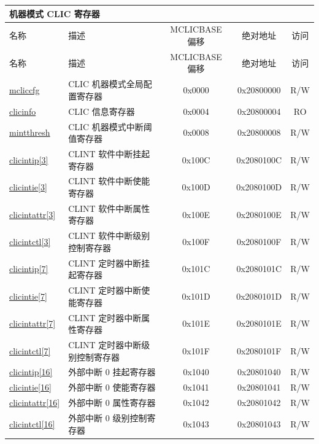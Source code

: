 \begin{longtable}{ | p{1.8cm} | p{7.5cm} | c | c | c | }
\hline
\multicolumn{5}{|l|}{\textbf{机器模式 CLIC 寄存器}} \\\hline
\hline\rowcolor{lightgray}
名称 & 描述 & MCLICBASE 偏移 & 绝对地址 & 访问 \\ \hline
\endfirsthead
\hline
\rowcolor{lightgray}
名称 & 描述 & MCLICBASE 偏移 & 绝对地址 & 访问 \\
\hline
\endhead
\endfoot
\hyperref[regdesc:MCLICCFG_REG]{mcliccfg} & CLIC 机器模式全局配置寄存器 & 0x0000 & 0x20800000 & R/W \\\hline
\hyperref[regdesc:CLICINFO_REG]{clicinfo} & CLIC 信息寄存器 & 0x0004 & 0x20800004 & RO \\\hline
\hyperref[regdesc:MINTTHRESH]{mintthresh} & CLIC 机器模式中断阈值寄存器 & 0x0008 & 0x20800008 & R/W \\\hline

\hyperref[regdesc:MCLICINTIP_REG_i]{clicintip[3]} & CLINT 软件中断挂起寄存器 & 0x100C & 0x2080100C & R/W \\\hline
\hyperref[regdesc:MCLICINTIE_REG_i]{clicintie[3]} & CLINT 软件中断使能寄存器 & 0x100D & 0x2080100D & R/W \\\hline
\hyperref[regdesc:MCLICINTATTR_REG_i]{clicintattr[3]} & CLINT 软件中断属性寄存器 & 0x100E & 0x2080100E & R/W \\\hline
\hyperref[regdesc:MCLICINTCTL_REG_i]{clicintctl[3]} & CLINT 软件中断级别控制寄存器 & 0x100F & 0x2080100F & R/W \\\hline

\hyperref[regdesc:MCLICINTIP_REG_i]{clicintip[7]} & CLINT 定时器中断挂起寄存器 & 0x101C & 0x2080101C & R/W \\\hline
\hyperref[regdesc:MCLICINTIE_REG_i]{clicintie[7]} & CLINT 定时器中断使能寄存器 & 0x101D & 0x2080101D & R/W \\\hline
\hyperref[regdesc:MCLICINTATTR_REG_i]{clicintattr[7]} & CLINT 定时器中断属性寄存器 & 0x101E & 0x2080101E & R/W \\\hline
\hyperref[regdesc:MCLICINTCTL_REG_i]{clicintctl[7]} & CLINT 定时器中断级别控制寄存器 & 0x101F & 0x2080101F & R/W \\\hline

\hyperref[regdesc:MCLICINTIP_REG_i]{clicintip[16]} & 外部中断 0 挂起寄存器 & 0x1040 & 0x20801040 & R/W \\\hline
\hyperref[regdesc:MCLICINTIE_REG_i]{clicintie[16]} & 外部中断 0 使能寄存器 & 0x1041 & 0x20801041 & R/W \\\hline
\hyperref[regdesc:MCLICINTATTR_REG_i]{clicintattr[16]} & 外部中断 0 属性寄存器 & 0x1042 & 0x20801042 & R/W \\\hline
\hyperref[regdesc:MCLICINTCTL_REG_i]{clicintctl[16]} & 外部中断 0 级别控制寄存器 & 0x1043 & 0x20801043 & R/W \\\hline


\end{longtable}
